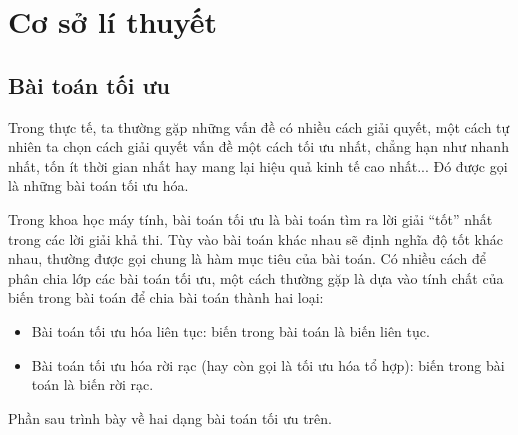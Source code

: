 \setcounter{page}{1}
\chapter{Cơ sở lí thuyết}
\section{Bài toán tối ưu}
Trong thực tế, ta thường gặp những vấn đề có nhiều cách giải quyết, một cách tự nhiên ta chọn cách giải quyết vấn đề một cách tối ưu nhất, chẳng hạn như nhanh nhất, tốn ít thời gian nhất hay mang lại hiệu quả kinh tế cao nhất... Đó được gọi là những bài toán tối ưu hóa.

Trong khoa học máy tính, bài toán tối ưu là bài toán tìm ra lời giải “tốt” nhất trong các lời giải khả thi. Tùy vào bài toán khác nhau sẽ định nghĩa độ tốt khác nhau, thường được gọi chung là hàm mục tiêu của bài toán. Có nhiều cách để phân chia lớp các bài toán tối ưu, một cách thường gặp là dựa vào tính chất của biến trong bài toán để chia bài toán thành hai loại: 
\begin{itemize}
    \item Bài toán tối ưu hóa liên tục: biến trong bài toán là biến liên tục. 
    \item Bài toán tối ưu hóa rời rạc (hay còn gọi là tối ưu hóa tổ hợp): biến trong bài toán là biến rời rạc.
\end{itemize}
Phần sau trình bày về hai dạng bài toán tối ưu trên. 

